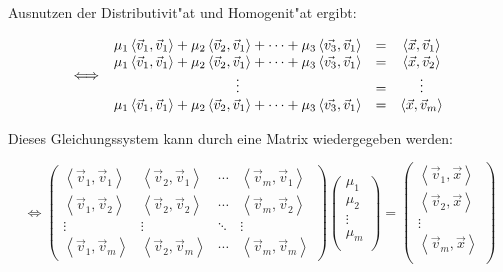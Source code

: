 \documentclass{article}
\newcommand{\lrangle}[1]{\left\langle #1 \right\rangle}
\begin{document}
Ausnutzen der Distributivit"at und Homogenit"at ergibt:

    \begin{equation}
        \iff
        \begin{array}{c c c}
            \mu _1 \lrangle{ \vec{v}_1, \vec{v}_1 } + \mu _2 \lrangle{
              \vec{v}_2, \vec{v}_1 } + \cdots + \mu _3 \lrangle{ \vec{v_3},
              \vec{v}_1 } &
            = &
            \lrangle{ \vec{x}, \vec{v}_1 } \\
            \mu _1 \lrangle{ \vec{v}_1, \vec{v}_1 } + \mu _2 \lrangle{
              \vec{v}_2, \vec{v}_1 } + \cdots + \mu _3 \lrangle{ \vec{v_3},
              \vec{v}_1 } &
            = &
            \lrangle{ \vec{x}, \vec{v}_2 } \\
            \vdots &
            = &
            \vdots \\
            \mu _1 \lrangle{ \vec{v}_1, \vec{v}_1 } + \mu _2 \lrangle{
              \vec{v}_2, \vec{v}_1 } + \cdots + \mu _3 \lrangle{ \vec{v_3},
              \vec{v}_1 } &
            = &
            \lrangle{ \vec{x}, \vec{v}_m }
        \end{array}
    \end{equation}

Dieses Gleichungssystem kann durch eine Matrix wiedergegeben werden:

    \begin{equation}
        \iff
        \begin{pmatrix}
            \lrangle{ \vec{v}_1, \vec{v}_1 } &
            \lrangle{ \vec{v}_2, \vec{v}_1 } &
            \cdots &
            \lrangle{ \vec{v}_m, \vec{v}_1 } \\
            \lrangle{ \vec{v}_1, \vec{v}_2 } &
            \lrangle{ \vec{v}_2, \vec{v}_2 } &
            \cdots &
            \lrangle{ \vec{v}_m, \vec{v}_2 } \\
            \vdots & \vdots & \ddots & \vdots \\
            \lrangle{ \vec{v}_1, \vec{v}_m } &
            \lrangle{ \vec{v}_2, \vec{v}_m } &
            \cdots &
            \lrangle{ \vec{v}_m, \vec{v}_m }
        \end{pmatrix}
        \begin{pmatrix}
            \mu _1 \\
            \mu _2 \\
            \vdots \\
            \mu _m \\
        \end{pmatrix}
        =
        \begin{pmatrix}
            \lrangle{ \vec{v}_1, \vec{x} } \\
            \lrangle{ \vec{v}_2, \vec{x} } \\
            \vdots \\
            \lrangle{ \vec{v}_m, \vec{x} } \\
        \end{pmatrix}
    \end{equation}
\end{document}
